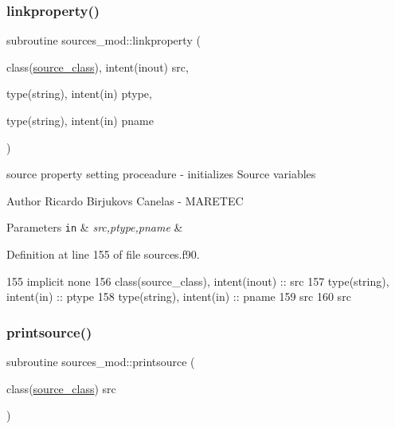 \subsubsection{\texorpdfstring{linkproperty()}{linkproperty()}}
{\footnotesize\ttfamily subroutine sources\+\_\+mod\+::linkproperty (\begin{DoxyParamCaption}\item[{class(\mbox{\hyperlink{structsources__mod_1_1source__class}{source\+\_\+class}}), intent(inout)}]{src,  }\item[{type(string), intent(in)}]{ptype,  }\item[{type(string), intent(in)}]{pname }\end{DoxyParamCaption})\hspace{0.3cm}{\ttfamily [private]}}



source property setting proceadure -\/ initializes Source variables 

\begin{DoxyAuthor}{Author}
Ricardo Birjukovs Canelas -\/ M\+A\+R\+E\+T\+EC 
\end{DoxyAuthor}

\begin{DoxyParams}[1]{Parameters}
\mbox{\tt in}  & {\em src,ptype,pname} & \\
\hline
\end{DoxyParams}


Definition at line 155 of file sources.\+f90.


\begin{DoxyCode}
155     \textcolor{keywordtype}{implicit none}
156     \textcolor{keywordtype}{class}(source\_class), \textcolor{keywordtype}{intent(inout)} :: src
157     \textcolor{keywordtype}{type}(string), \textcolor{keywordtype}{intent(in)} :: ptype
158     \textcolor{keywordtype}{type}(string), \textcolor{keywordtype}{intent(in)} :: pname
159     src%
160     src%
\end{DoxyCode}
\mbox{\label{namespacesources__mod_a641fe9ecc295e486a714c1aaa133d991}} 
\subsubsection{\texorpdfstring{printsource()}{printsource()}}
{\footnotesize\ttfamily subroutine sources\+\_\+mod\+::printsource (\begin{DoxyParamCaption}\item[{class(\mbox{\hyperlink{structsources__mod_1_1source__class}{source\+\_\+class}})}]{src }\end{DoxyParamCaption})\hspace{0.3cm}{\ttfamily [private]}}



